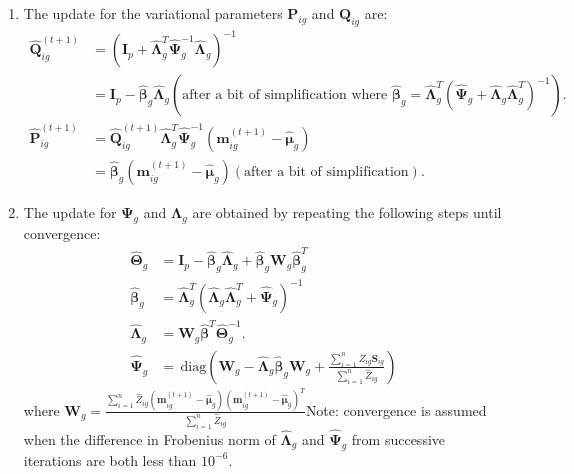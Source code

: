 \documentclass[12pt]{article}
\newcommand{\bI}{\mathbf{I}}
\newcommand{\bP}{\mathbf{P}}
\newcommand{\bQ}{\mathbf{Q}}
\newcommand{\bS}{\mathbf{S}}
\newcommand{\bW}{\mathbf{W}}
\newcommand{\bmm}{\mathbf{m}}
\newcommand{\bbeta}{\boldsymbol{\beta}}
\newcommand{\bTheta}{\boldsymbol{\Theta}}
\newcommand{\bmu}{\boldsymbol{\mu}}
\newcommand{\bLambda}{\boldsymbol{\Lambda}}
\newcommand{\bPsi}{\boldsymbol{\Psi}}
\newcommand{\diag}{\,\mbox{diag}}
\begin{document}
\begin{enumerate}
\item The update for the variational parameters $\bP_{ig}$ and $\bQ_{ig}$ are:
\begin{align*}
\widehat{\bQ}_{ig}^{(t+1)}&=(\bI_p+\hat{\bLambda}_g^T\hat{\bPsi}_g^{-1}\hat{\bLambda}_g)^{-1}\\
&=\bI_p-\hat{\bbeta}_g\hat{\bLambda}_g (\text{after a bit of simplification where }\hat{\bbeta}_g=\hat{\bLambda}_g^T(\hat{\bPsi}_g+\hat{\bLambda}_g\hat{\bLambda}_g^T)^{-1}).\\
\widehat{\bP}_{ig}^{(t+1)}&=\widehat{\bQ}_{ig}^{(t+1)}\hat{\bLambda}_g^T\hat{\bPsi}^{-1}_g(\bmm_{ig}^{(t+1)}-\hat{\bmu}_{g})\\
&=\hat{\bbeta}_g(\bmm_{ig}^{(t+1)}-\hat{\bmu}_{g}) \left(\text{after a bit of simplification}\right).
\end{align*}
\item The update for $\bPsi_g$ and $\bLambda_g$ are obtained by repeating the following steps until convergence:
\begin{align}
\widehat{\bTheta}_g&=\bI_p-\hat{\bbeta}_g\hat{\bLambda}_g+\hat{\bbeta}_g\bW_g\hat{\bbeta}_g^T \nonumber\\
\hat{\bbeta}_g&=\hat{\bLambda}_g^T(\hat{\bLambda}_g\hat{\bLambda}_g^T+\hat{\bPsi}_g)^{-1} \nonumber \\
\hat{\bLambda}_g&=\bW_g\hat{\bbeta}^T\widehat{\bTheta}_g^{-1}.\\
\hat{\bPsi}_g&=\diag\left(\bW_g-\hat{\bLambda}_g\hat{\bbeta}_g\bW_g+\frac{\sum_{i=1}^n \widehat{Z}_{ig}\bS_{ig}}{\sum_{i=1}^n\widehat{Z}_{ig}}\right)
\end{align}
where $\bW_{g}=\frac{\sum_{i=1}^n\widehat{Z}_{ig}(\bmm_{ig}^{(t+1)}-\hat{\bmu}_g)(\bmm_{ig}^{(t+1)}-\hat{\bmu}_g)^T}{\sum_{i=1}^n\widehat{Z}_{ig}}$Note: convergence is assumed when the difference in Frobenius norm of $\hat{\bLambda}_g$ and $\hat{\bPsi}_g$ from successive iterations are both less than $10^{-6}$.
\end{enumerate}
\end{document}
